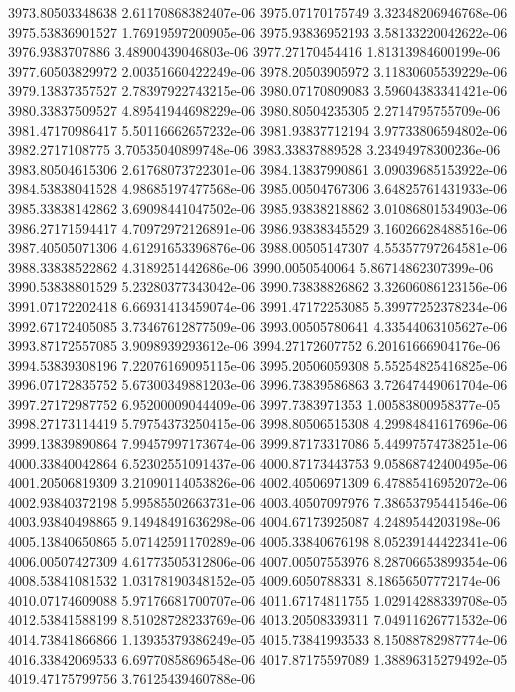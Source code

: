 {3973.80503348638 2.61170868382407e-06
3975.07170175749 3.32348206946768e-06
3975.53836901527 1.76919597200905e-06
3975.93836952193 3.58133220042622e-06
3976.9383707886 3.48900439046803e-06
3977.27170454416 1.81313984600199e-06
3977.60503829972 2.00351660422249e-06
3978.20503905972 3.11830605539229e-06
3979.13837357527 2.78397922743215e-06
3980.07170809083 3.59604383341421e-06
3980.33837509527 4.89541944698229e-06
3980.80504235305 2.2714795755709e-06
3981.47170986417 5.50116662657232e-06
3981.93837712194 3.97733806594802e-06
3982.2717108775 3.70535040899748e-06
3983.33837889528 3.23494978300236e-06
3983.80504615306 2.61768073722301e-06
3984.13837990861 3.09039685153922e-06
3984.53838041528 4.98685197477568e-06
3985.00504767306 3.64825761431933e-06
3985.33838142862 3.69098441047502e-06
3985.93838218862 3.01086801534903e-06
3986.27171594417 4.70972972126891e-06
3986.93838345529 3.16026628488516e-06
3987.40505071306 4.61291653396876e-06
3988.00505147307 4.55357797264581e-06
3988.33838522862 4.3189251442686e-06
3990.0050540064 5.86714862307399e-06
3990.53838801529 5.23280377343042e-06
3990.73838826862 3.32606086123156e-06
3991.07172202418 6.66931413459074e-06
3991.47172253085 5.39977252378234e-06
3992.67172405085 3.73467612877509e-06
3993.00505780641 4.33544063105627e-06
3993.87172557085 3.9098939293612e-06
3994.27172607752 6.20161666904176e-06
3994.53839308196 7.22076169095115e-06
3995.20506059308 5.55254825416825e-06
3996.07172835752 5.67300349881203e-06
3996.73839586863 3.72647449061704e-06
3997.27172987752 6.95200009044409e-06
3997.7383971353 1.00583800958377e-05
3998.27173114419 5.79754373250415e-06
3998.80506515308 4.29984841617696e-06
3999.13839890864 7.99457997173674e-06
3999.87173317086 5.44997574738251e-06
4000.33840042864 6.52302551091437e-06
4000.87173443753 9.05868742400495e-06
4001.20506819309 3.21090114053826e-06
4002.40506971309 6.47885416952072e-06
4002.93840372198 5.99585502663731e-06
4003.40507097976 7.38653795441546e-06
4003.93840498865 9.14948491636298e-06
4004.67173925087 4.2489544203198e-06
4005.13840650865 5.07142591170289e-06
4005.33840676198 8.05239144422341e-06
4006.00507427309 4.61773505312806e-06
4007.00507553976 8.28706653899354e-06
4008.53841081532 1.03178190348152e-05
4009.6050788331 8.18656507772174e-06
4010.07174609088 5.97176681700707e-06
4011.67174811755 1.02914288339708e-05
4012.53841588199 8.51028728233769e-06
4013.20508339311 7.04911626771532e-06
4014.73841866866 1.13935379386249e-05
4015.73841993533 8.15088782987774e-06
4016.33842069533 6.69770858696548e-06
4017.87175597089 1.38896315279492e-05
4019.47175799756 3.76125439460788e-06
}
